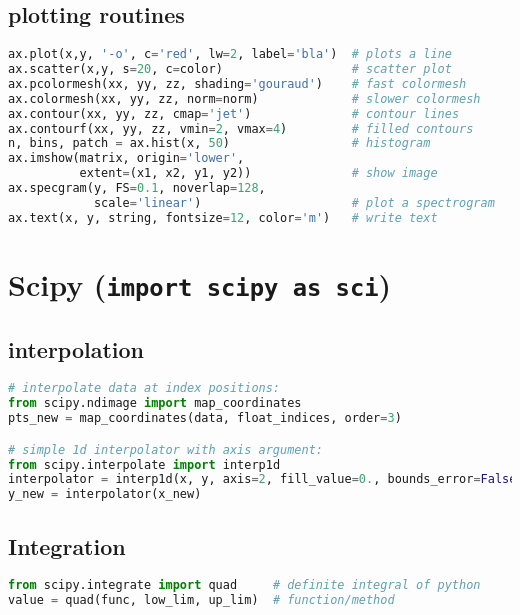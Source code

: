 \subsection{plotting routines}\label{plotting-routines}

\begin{lstlisting}[language=Python]
ax.plot(x,y, '-o', c='red', lw=2, label='bla')  # plots a line
ax.scatter(x,y, s=20, c=color)                  # scatter plot
ax.pcolormesh(xx, yy, zz, shading='gouraud')    # fast colormesh
ax.colormesh(xx, yy, zz, norm=norm)             # slower colormesh
ax.contour(xx, yy, zz, cmap='jet')              # contour lines
ax.contourf(xx, yy, zz, vmin=2, vmax=4)         # filled contours
n, bins, patch = ax.hist(x, 50)                 # histogram
ax.imshow(matrix, origin='lower',
          extent=(x1, x2, y1, y2))              # show image
ax.specgram(y, FS=0.1, noverlap=128,
            scale='linear')                     # plot a spectrogram
ax.text(x, y, string, fontsize=12, color='m')   # write text
\end{lstlisting}

\section{\texorpdfstring{Scipy
(\texttt{import\ scipy\ as\ sci})}{Scipy (import scipy as sci)}}\label{scipy-import-scipy-as-sci}

\subsection{interpolation}\label{interpolation}

\begin{lstlisting}[language=Python]
# interpolate data at index positions:
from scipy.ndimage import map_coordinates
pts_new = map_coordinates(data, float_indices, order=3)

# simple 1d interpolator with axis argument:
from scipy.interpolate import interp1d
interpolator = interp1d(x, y, axis=2, fill_value=0., bounds_error=False)
y_new = interpolator(x_new)
\end{lstlisting}

\subsection{Integration}\label{integration}

\begin{lstlisting}[language=Python]
from scipy.integrate import quad     # definite integral of python
value = quad(func, low_lim, up_lim)  # function/method
\end{lstlisting}

